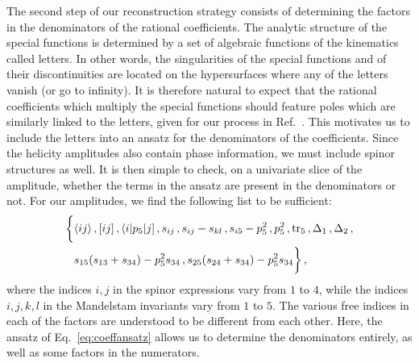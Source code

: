 \documentclass[main.tex]{subfiles}
\begin{document}
The second step of our reconstruction strategy consists of determining the factors in the denominators of the rational coefficients. The analytic structure of the special functions is determined by a set of algebraic functions of the kinematics called letters. In other words, the singularities of the special functions and of their discontinuities are located on the hypersurfaces where any of the letters vanish (or go to infinity). It is therefore natural to expect that the rational coefficients which multiply the special functions should feature poles which are similarly linked to the letters, given for our process in Ref.~\cite{Abreu:2020jxa}. 
This motivates us to include the letters into an ansatz for the denominators of the coefficients. Since the helicity amplitudes also contain phase information, we must include spinor structures as well. It is then simple to check, on a univariate slice of the amplitude, whether the terms in the ansatz are present in the denominators or not. For our amplitudes, we find the following list to be sufficient:
\begin{equation}
\begin{aligned}
\biggl\{  & \langle ij\rangle \,,  [ij]  \,, \langle i|p_5|j]  \,, s_{ij} \,, s_{ij} - s_{kl} \,, 
  s_{i5} - p_5^2 \,, p_5^2 \,, \operatorname{\rm tr}_5 \, , \Delta_1 \,, \Delta_2 \, , \\
&  s_{15} (s_{13}+s_{34}) - p_5^2  s_{34}  \,,
 s_{25} (s_{24}+s_{34}) - p_5^2  s_{34} \biggr\} \,,
\end{aligned}
\label{eq:coeffansatz}
\end{equation}
where the indices $i,j$ in the spinor expressions vary from $1$ to $4$, while the indices $i,j,k,l$ in the Mandelstam invariants vary from $1$ to $5$. The various free indices in each of the factors are understood to be different from each other. Here, the ansatz of Eq.~\ref{eq:coeffansatz} allows us to determine the denominators entirely, as well as some factors in the numerators.
\end{document}
